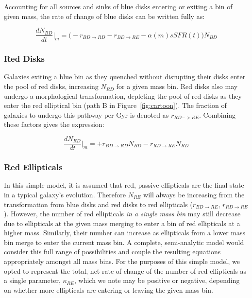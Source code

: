 \documentclass[useAMS,usenatbib]{mn2e}
\begin{document}
Accounting for all sources and sinks of blue disks entering or exiting a bin of given mass, the rate of change of blue disks can be written fully as:

\begin{equation}
\frac{dN_{BD}}{dt}\Big\rvert_{m} = \Big(-r_{BD \rightarrow RD} - r_{BD\rightarrow RE} -\alpha(m) sSFR(t) \Big)N_{BD}
\label{eqn:BD}
\end{equation}

\subsubsection{Red Disks}
Galaxies exiting a blue bin as they quenched without disrupting their disks enter the pool of red disks, increasing $N_{RD}$ for a given mass bin. Red disks also may undergo a morphological transformation, depleting the pool of red disks as they enter the red elliptical bin (path B in Figure~\ref{fig:cartoon}). The fraction of galaxies to undergo this pathway per Gyr is denoted as $r_{RD->RE}$. Combining these factors gives the expression: 

\begin{equation}
\frac{dN_{RD}}{dt}\Big\rvert_{m} = + r_{BD \rightarrow RD}N_{BD} - r_{RD \rightarrow RE}N_{RD}
\label{eqn:RD}
\end{equation}

\subsubsection{Red Ellipticals}
In this simple model, it is assumed that red, passive ellipticals are the final state in a typical galaxy's evolution. Therefore $N_{RE}$ will always be increasing from the transformation from blue disks and red disks to red ellipticals ($r_{BD \rightarrow RE}$, $r_{RD \rightarrow RE}$). However, the number of red ellipticals \emph{in a single mass bin} may still decrease due to ellipticals at the given mass merging to enter a bin of red ellipticals at a higher mass. Similarly, their number can increase as ellipticals from a lower mass bin merge to enter the current mass bin. A complete, semi-analytic model would consider this full range of possibilities and couple the resulting equations appropriately amongst all mass bins. For the purposes of this simple model, we opted to represent the total, net rate of change of the number of red ellipticals as a single parameter, $\kappa_{RE}$, which we note may be positive or negative, depending on whether more ellipticals are entering or leaving the given mass bin. 
\end{document}
